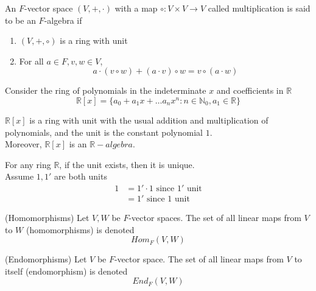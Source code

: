 \begin{definition}
    An $F$-vector space $(V, +, \cdot)$ with a map $\circ: V \times V \to V$ called multiplication  is said to be an $F$-algebra if 
    \begin{enumerate}
        \item $(V, + , \circ)$ is a ring with unit \\
        \item For all $a \in F, v, w \in V$, 
        \[
            a \cdot (v \circ w) + (a \cdot v) \circ w = v \circ (a \cdot w)
        \]
    \end{enumerate}
\end{definition}

\begin{example}
    Consider the ring of polynomials in the indeterminate $x$ and coefficients in $\mathbb{R}$ 
    \[
        \mathbb{R}[x] = \{ a_0 + a_1 x + \hdots a_n x^n : n \in \mathbb{N}_{0}, a_1 \in \mathbb{R}\} 
    \]

    $\mathbb{R}[x]$ is a ring with unit with the usual addition and multiplication of polynomials, and the unit is the constant polynomial $1$. \\

    Moreover, $\mathbb{R}[x]$ is an $\mathbb{R}-algebra$.
\end{example}

\begin{remark}
    For any ring $\mathbb{R}$, if the unit exists, then it is unique. \\

    Assume $1, 1'$ are both units 
    \begin{align*}
        1 &= 1' \cdot 1 \text{ since $1'$ unit} \\
        &= 1' \text{ since $1$ unit}
    \end{align*}
\end{remark}

\begin{definition}
    (Homomorphisms) Let $V, W$ be $F$-vector spaces. The set of all linear maps from $V$ to $W$ (homomorphisms) is denoted
    \[
        Hom_F(V,W)
    \]
\end{definition}

\begin{definition}
    (Endomorphisms) Let $V$ be $F$-vector space. The set of all linear maps from $V$ to itself (endomorphism) is denoted
    \[
        End_F(V,W)
    \]
\end{definition}

